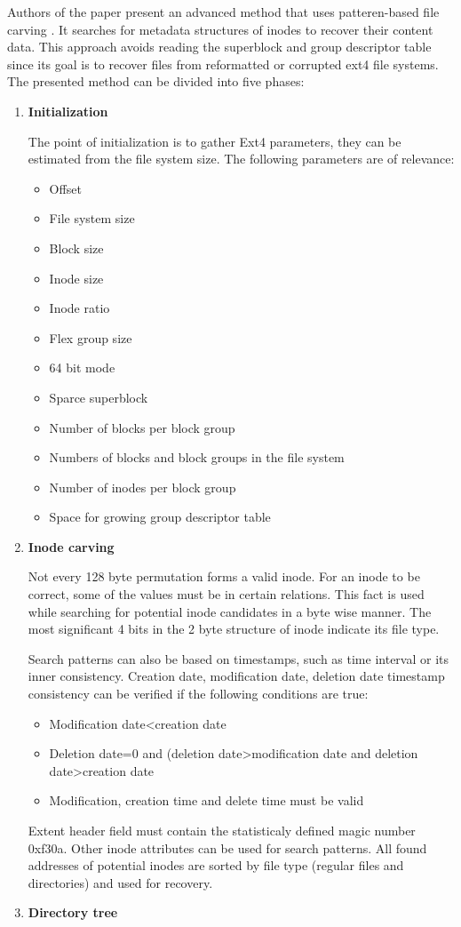 \documentclass{acm_proc_article-sp}
\begin{document}
Authors of the paper present an advanced method that uses patteren-based file carving . It searches for metadata structures of inodes to recover their content data. This approach avoids reading the superblock and group descriptor table since its goal is to recover files from reformatted or corrupted ext4 file systems. The presented method can be divided into five phases\cite{merola2008data}:
\begin{enumerate}
\item \textbf{Initialization}

The point of initialization  is to gather Ext4 parameters, they can be estimated from the file system size. The following parameters are of relevance:
\begin{itemize} 
\item Offset
\item File system size
\item Block size
\item Inode size
\item Inode ratio
\item Flex group size
\item 64 bit mode
\item Sparce superblock
\item Number of blocks per block group
\item Numbers of blocks and block groups in the file system
\item Number of inodes per block group
\item Space for growing group descriptor table
\end{itemize}
\item \textbf{Inode carving}

Not every 128 byte permutation forms a valid inode. For an inode to be correct, some of the values must be in certain relations. This fact is used while searching for potential inode candidates in a byte wise manner. The most significant 4 bits in the 2 byte structure of inode indicate its file type.

Search patterns can also be based on timestamps, such as time interval or its inner consistency. Creation date, modification date, deletion date timestamp consistency can be verified if the following conditions are true:
\begin{itemize}
\item Modification date\textless creation date
\item Deletion date=0 and (deletion date\textgreater modification date and deletion date\textgreater creation date
\item Modification, creation time and delete time must be valid
\end{itemize}
Extent header field must contain the statisticaly defined magic number 0xf30a. Other inode attributes can be used for search patterns. All found addresses of potential inodes are sorted by file type (regular files and directories) and used for recovery.
\item \textbf{Directory tree}


\end{enumerate}
\end{document}
